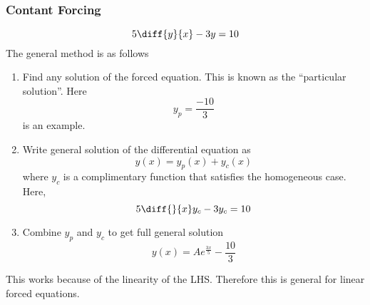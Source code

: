 \documentclass{article}
\begin{document}
\subsubsection*{Contant Forcing}
\begin{eg}
    \[
        5 \diff{y}{x} - 3y = 10
    \]
    The general method is as follows
    \begin{enumerate}
        \item Find any solution of the forced equation. This is known as the ``particular solution''. Here
        \[
            y_p = \frac{-10}{3}  
        \]
        is an example.
        \item Write general solution of the differential equation as
        \[
            y(x) = y_p(x) + y_c(x)  
        \]
        where $y_c$ is a complimentary function that satisfies the homogeneous case. Here,
        \[
            5 \diff{}{x} y_c - 3 y_c = 10  
        \]

        \item Combine $y_p$ and $y_c$ to get full general solution
        \[
            y(x) = Ae^\frac{3x}{5} - \frac{10}{3}  
        \]
    \end{enumerate}
    This works because of the linearity of the LHS. Therefore this is general for linear forced equations.
\end{eg}
\end{document}
